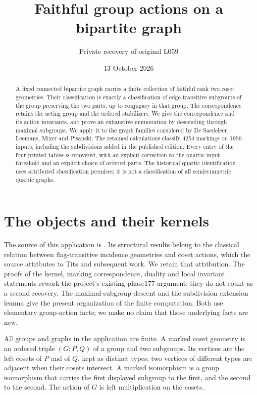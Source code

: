 \documentclass[11pt]{article}
\title{Faithful group actions on a bipartite graph}
\author{Private recovery of original L059}
\date{13 October 2026}
\theoremstyle{definition}\newtheorem{definition}[theorem]{Definition}
\begin{document}
\maketitle
\begin{abstract}
A fixed connected bipartite graph carries a finite collection of faithful
rank two coset geometries.  Their classification is exactly a classification
of edge-transitive subgroups of the group preserving the two parts, up to
conjugacy in that group.  The correspondence retains the acting group and
the ordered stabilizers.  We give the correspondence and its action
invariants, and prove an exhaustive enumeration by descending through
maximal subgroups.  We apply it to the graph families considered by De Saedeleer, Leemans,
Mixer and Pisanski.  The retained calculations classify 4254 markings
on 1950 inputs, including the subdivisions added in the published
edition.  Every entry of the four printed tables is recovered, with
an explicit correction to the quartic input threshold and an explicit
choice of ordered parts.  The historical quartic identification uses
attributed classification premises; it is not a classification of all
semisymmetric quartic graphs.
\end{abstract}

\section{The objects and their kernels}
The source of this application is \cite{L059}.  Its structural results
belong to the classical relation between flag-transitive incidence
geometries and coset actions, which the source attributes to Tits and
subsequent work.  We retain that attribution.  The proofs of the kernel, marking correspondence, duality and local
invariant statements rework the project's existing phase177 argument;
they do not count as a second recovery.  The maximal-subgroup descent
and the subdivision extension lemma give the present organization
of the finite computation.  Both use elementary group-action facts;
we make no claim that those underlying facts are new.

All groups and graphs in the application are finite.  A marked coset
geometry is an ordered triple $(G;P,Q)$ of a group and two subgroups.
Its vertices are the left cosets of $P$ and of $Q$, kept as distinct
types; two vertices of different types are adjacent when their cosets
intersect.  A marked isomorphism is a group isomorphism that carries
the first displayed subgroup to the first, and the second to the second.
The action of $G$ is left multiplication on the cosets.
\end{document}
